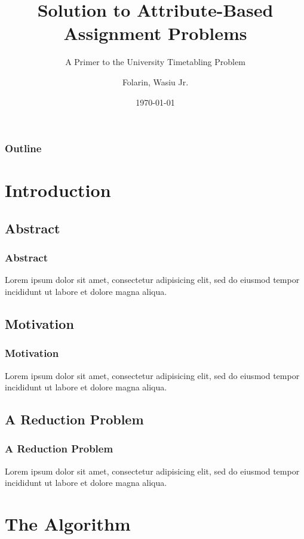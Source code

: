 \documentclass[10pt]{beamer}
\title{Solution to Attribute-Based Assignment Problems}
\subtitle{A Primer to the University Timetabling Problem}
\author{Folarin, Wasiu Jr.}
\institute{Department of Mathematics\\Obafemi Awolowo University\\Ile-Ife, Nigeria.}
\date{\today}
\begin{document}
	\begin{frame}
		\titlepage
	\end{frame}
	
	\begin{frame}
		\frametitle{Outline}
		\tableofcontents
	\end{frame}

	\section{Introduction}
		\subsection{Abstract}		
			\begin{frame}
				\frametitle{Abstract}
				Lorem ipsum dolor sit amet, consectetur adipisicing elit, sed do eiusmod tempor incididunt ut labore et dolore magna aliqua.
			\end{frame}
		
		\subsection{Motivation}		
			\begin{frame}
				\frametitle{Motivation}
				Lorem ipsum dolor sit amet, consectetur adipisicing elit, sed do eiusmod tempor incididunt ut labore et dolore magna aliqua.
			\end{frame}
		
		\subsection{A Reduction Problem}		
			\begin{frame}
				\frametitle{A Reduction Problem}
				Lorem ipsum dolor sit amet, consectetur adipisicing elit, sed do eiusmod tempor incididunt ut labore et dolore magna aliqua.
			\end{frame}
	
	\section{The Algorithm}
\end{document}
